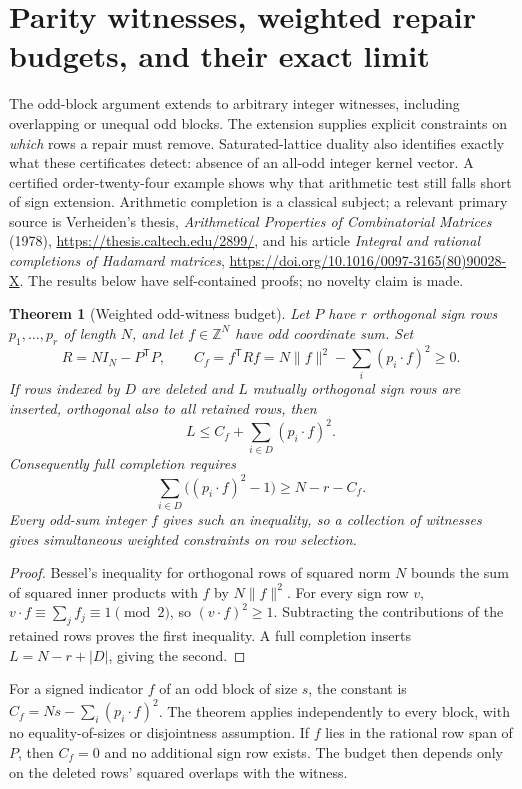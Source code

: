 \documentclass[11pt]{article}
\newtheorem{theorem}{Theorem}[section]
\begin{document}
\section{Parity witnesses, weighted repair budgets, and their exact limit}
\label{sec:parity-repair}

The odd-block argument extends to arbitrary integer witnesses, including
overlapping or unequal odd blocks. The extension supplies explicit
constraints on \emph{which} rows a repair must remove. Saturated-lattice
duality also identifies exactly what these certificates detect: absence
of an all-odd integer kernel vector. A certified order-twenty-four
example shows why that arithmetic test still falls short of sign
extension. Arithmetic completion is a classical subject; a relevant
primary source is Verheiden's thesis,
\emph{Arithmetical Properties of Combinatorial Matrices} (1978),
\url{https://thesis.caltech.edu/2899/}, and his article
\emph{Integral and rational completions of Hadamard matrices},
\url{https://doi.org/10.1016/0097-3165(80)90028-X}.
The results below have self-contained proofs; no novelty claim is made.

\begin{theorem}[Weighted odd-witness budget]
Let $P$ have $r$ orthogonal sign rows $p_1,\ldots,p_r$ of length $N$,
and let $f\in\mathbb Z^N$ have odd coordinate sum. Set
\[
 R=NI_N-P^{\mathsf T}P,\qquad
 C_f=f^{\mathsf T}Rf
     =N\|f\|^2-\sum_i(p_i\cdot f)^2\ge0.
\]
If rows indexed by $D$ are deleted and $L$ mutually orthogonal sign
rows are inserted, orthogonal also to all retained rows, then
\[
 L\le C_f+\sum_{i\in D}(p_i\cdot f)^2.
\]
Consequently full completion requires
\[
 \sum_{i\in D}\bigl((p_i\cdot f)^2-1\bigr)
       \ge N-r-C_f.
\]
Every odd-sum integer $f$ gives such an inequality, so a collection
of witnesses gives simultaneous weighted constraints on row selection.
\end{theorem}
\begin{proof}
Bessel's inequality for orthogonal rows of squared norm $N$ bounds
the sum of squared inner products with $f$ by $N\|f\|^2$.
For every sign row $v$, $v\cdot f\equiv\sum_j f_j\equiv1\pmod2$,
so $(v\cdot f)^2\ge1$. Subtracting the contributions of the retained
rows proves the first inequality. A full completion inserts
$L=N-r+|D|$, giving the second.
\end{proof}

For a signed indicator $f$ of an odd block of size $s$, the constant
is $C_f=Ns-\sum_i(p_i\cdot f)^2$. The theorem applies independently
to every block, with no equality-of-sizes or disjointness assumption.
If $f$ lies in the rational row span of $P$, then $C_f=0$ and no
additional sign row exists. The budget then depends only on the
deleted rows' squared overlaps with the witness.
\end{document}
